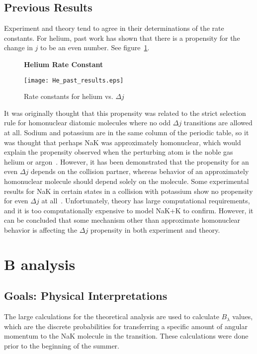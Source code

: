\documentclass[letterpaper,titlepage,12pt]{article}
\begin{document}
\subsection{Previous Results}
Experiment and theory tend to agree in their determinations of the rate
constants.  For helium, past work has shown that there is a propensity for the
change in $j$ to be an even number. See figure~\ref{fig:He_past_results}.
\begin{figure}[ht]
    \centering
    \textbf{Helium Rate Constant}\par\medskip
    \texttt{[image: He\_past\_results.eps]}
    \caption{Rate constants for helium vs. $\Delta j$~\cite{Mal15}}
\label{fig:He_past_results}
\end{figure}

It was originally thought that this propensity was related to the strict
selection rule for homonuclear diatomic molecules where no odd $\Delta j$
transitions are allowed at all.  Sodium and potassium are in the same column of
the periodic table, so it was thought that perhaps NaK was approximately
homonuclear, which would explain the propensity observed when the perturbing
atom is the noble gas helium or argon~\cite{Jon15}.  However, it has been
demonstrated that the propensity for an even $\Delta j$ depends on the
collision partner, whereas behavior of an approximately homonuclear molecule
should depend solely on the molecule.  Some experimental results for NaK in
certain states in a collision with potassium show no propensity for even
$\Delta j$ at all~\cite{Wol11}.  Unfortunately, theory has large computational
requirements, and it is too computationally expensive to model NaK+K to
confirm.  However, it can be concluded that some mechanism other than
approximate homonuclear behavior is affecting the $\Delta j$ propensity in both
experiment and theory.

\clearpage
\section{B analysis}
\subsection{Goals: Physical Interpretations}
The large calculations for the theoretical analysis are used to calculate
$B_\lambda$ values, which are the discrete probabilities for transferring
a specific amount of angular momentum to the NaK molecule in the transition.
These calculations were done prior to the beginning of the summer.
\end{document}
